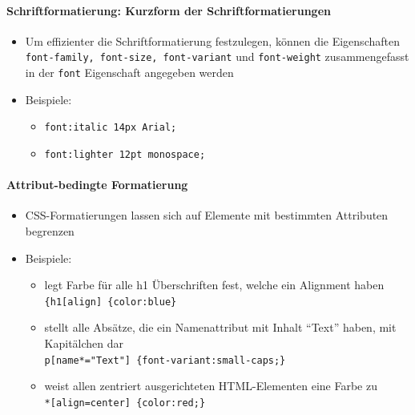 \documentclass[10pt,a4paper]{article}
\begin{document}
\paragraph{Schriftformatierung: Kurzform der Schriftformatierungen}
\begin{itemize}[noitemsep,topsep=0pt,leftmargin=*]
    \item Um effizienter die Schriftformatierung festzulegen, können die Eigenschaften \texttt{font-family, font-size, font-variant} und \texttt{font-weight} zusammengefasst in der \texttt{font} Eigenschaft angegeben werden
    \item Beispiele:
    \begin{itemize}[noitemsep,topsep=0pt,leftmargin=*]
        \item \texttt{font:italic 14px Arial;}
        \item \texttt{font:lighter 12pt monospace;}
    \end{itemize}
\end{itemize}

\paragraph{Attribut-bedingte Formatierung}
\begin{itemize}[noitemsep,topsep=0pt,leftmargin=*]
    \item CSS-Formatierungen lassen sich auf Elemente mit bestimmten Attributen begrenzen
    \item Beispiele:
    \begin{itemize}[noitemsep,topsep=0pt,leftmargin=*]
        \item legt Farbe für alle h1 Überschriften fest, welche ein Alignment haben\\
        \verb|{h1[align] {color:blue}|
        \item stellt alle Absätze, die ein Namenattribut mit Inhalt "`Text"' haben, mit Kapitälchen dar\\
        \verb|p[name*="Text"] {font-variant:small-caps;}|
        \item weist allen zentriert ausgerichteten HTML-Elementen eine Farbe zu\\
        \verb|*[align=center] {color:red;}|
    \end{itemize}
\end{itemize}
\end{document}
